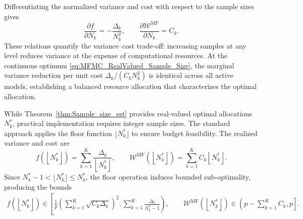 Differentiating the normalized variance and cost with respect to the sample sizes gives
%
\[
\frac{\partial f}{\partial N_k} = -\frac{\Delta_k}{N_k^2},
\qquad 
\frac{\partial \mathcal{W}^{\text{MF}}}{\partial N_k} = C_k.
\]
%
These relations quantify the variance–cost trade-off: increasing samples at any level reduces variance at the expense of computational resources. At the continuous optimum \eqref{eq:MFMC_RealValued_Sample_Size}, the marginal variance reduction per unit cost $\Delta_k/(C_k N_k^2)$ is identical across all active models, establishing a balanced resource allocation that characterizes the optimal allocation.

While Theorem~\ref{thm:Sample_size_est} provides real-valued optimal allocations $N_k^*$, practical implementation requires integer sample sizes. The standard approach \cite{PeWiGu:2016} applies the floor function $\lfloor N_k^* \rfloor$ to ensure budget feasibility. The realized variance and cost are
%
\[
f\left(\left\lfloor N_k^* \right\rfloor\right) = \sum_{k=1}^K\frac{\Delta_{k}}{\left\lfloor N_k^* \right\rfloor}, \qquad \mathcal{W}^{\text{MF}}\left(\left\lfloor N_k^* \right\rfloor\right) = \sum_{k=1}^K C_k\left\lfloor N_k^* \right\rfloor.
\]
%
Since $N_k^*-1 < \lfloor N_k^*\rfloor \le N_k^*$, the floor operation induces bounded sub-optimality, producing the bounds
%
\begin{equation}\label{eq:bounds_for_floor}
\begin{aligned}
    f\left(\left\lfloor N_k^* \right\rfloor\right) \in \left[\frac{1}{p}\left(\sum_{k=1}^K \sqrt{C_k\Delta_k}\right)^2, \sum_{k=1}^K\frac{\Delta_{k}}{N_k^*-1}\right), \qquad
\mathcal{W}^{\text{MF}}\left(\left\lfloor N_k^* \right\rfloor\right)\in \left( p-\sum_{k=1}^K C_k, p\right].
\end{aligned}
\end{equation}
